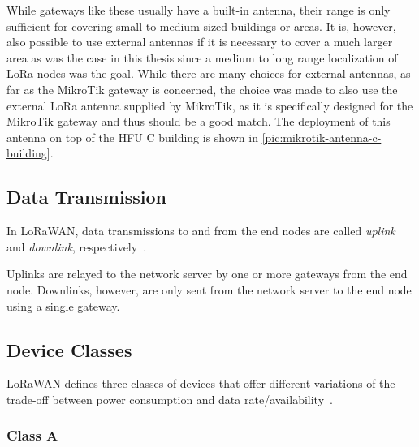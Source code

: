 While gateways like these usually have a built-in antenna, their range is only sufficient for covering small to medium-sized buildings or areas.
It is, however, also possible to use external antennas if it is necessary to cover a much larger area as was the case in this thesis since a medium to long range localization of \ac{LoRa} nodes was the goal.
While there are many choices for external antennas, as far as the MikroTik gateway is concerned, the choice was made to also use the external \ac{LoRa} antenna supplied by MikroTik, as it is specifically designed for the MikroTik gateway and thus should be a good match.
The deployment of this antenna on top of the \ac{HFU} C building is shown in \cref{pic:mikrotik-antenna-c-building}.

\subsection{Data Transmission}

In LoRaWAN, data transmissions to and from the end nodes are called \emph{uplink} and \emph{downlink}, respectively~\cite[p. 12]{lora_alliance_inc_lorawan_2017}.

Uplinks are relayed to the network server by one or more gateways from the end node.
Downlinks, however, are only sent from the network server to the end node using a single gateway.
\subsection{Device Classes}

\ac{LoRaWAN} defines three classes of devices that offer different variations of the trade-off between power consumption and data rate/availability~\cite[p. 10]{lora_alliance_inc_lorawan_2017}.

\subsubsection{Class A}


